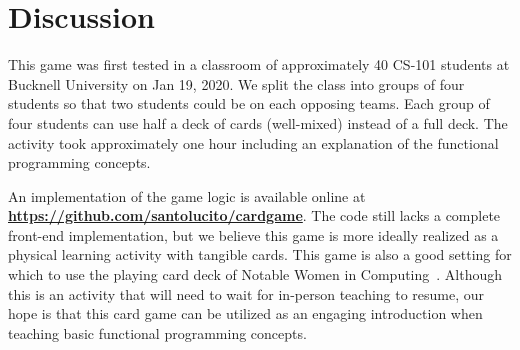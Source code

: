 \documentclass[sigconf]{acmart}
\begin{document}
\section{Discussion}

This game was first tested in a classroom of approximately 40 CS-101 students at Bucknell University on Jan 19, 2020. 
We split the class into groups of four students so that two students could be on each opposing teams. 
Each group of four students can use half a deck of cards (well-mixed) instead of a full deck. 
The activity took approximately one hour including an explanation of the functional programming concepts.

An implementation of the game logic is available online at \textbf{\url{https://github.com/santolucito/cardgame}}. 
The code still lacks a complete front-end implementation, but we believe this game is more ideally realized as a physical learning activity with tangible cards.
This game is also a good setting for which to use the playing card deck of Notable Women in Computing~\cite{womenCards}.
Although this is an activity that will need to wait for in-person teaching to resume, our hope is that this card game can be utilized as an engaging introduction when teaching basic functional programming concepts.





\end{document}
